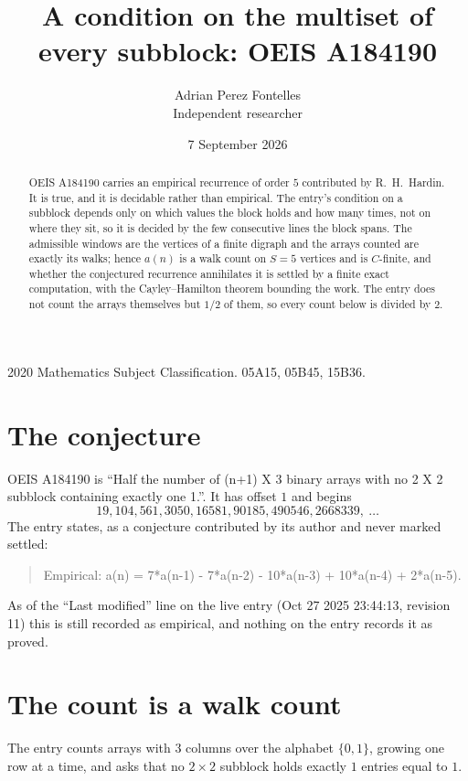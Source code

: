 \documentclass[11pt,a4paper]{article}
\title{A condition on the multiset of every subblock: OEIS A184190}
\author{Adrian Perez Fontelles\\ \small Independent researcher}
\date{7 September 2026}
\theoremstyle{plain}
\theoremstyle{definition}
\begin{document}
\maketitle

\begin{abstract}
OEIS A184190 carries an empirical recurrence of order $5$ contributed by R.~H.~Hardin. It is
true, and it is decidable rather than empirical. The entry's condition on a subblock depends
only on which values the block holds and how many times, not on where they sit, so it is
decided by the few consecutive lines the block spans. The admissible windows are the vertices
of a finite digraph and the arrays counted are exactly its walks; hence $a(n)$ is a walk count
on $S=5$ vertices and is $C$-finite, and whether the conjectured recurrence annihilates it
is settled by a finite exact computation, with the Cayley--Hamilton theorem bounding the
work. The entry does not count the arrays themselves but $1/2$ of them, so every count below is divided by $2$.
\end{abstract}

\noindent\small 2020 Mathematics Subject Classification. 05A15, 05B45, 15B36.\normalsize

\section{The conjecture}

OEIS A184190 is ``Half the number of (n+1) X 3 binary arrays with no 2 X 2 subblock containing exactly one 1.''. It has offset $1$ and begins
\[
19, 104, 561, 3050, 16581, 90185, 490546, 2668339,\ \dots
\]
The entry states, as a conjecture contributed by its author and never marked settled:
\begin{quote}
Empirical: a(n) = 7*a(n-1) - 7*a(n-2) - 10*a(n-3) + 10*a(n-4) + 2*a(n-5).
\end{quote}
As of the ``Last modified'' line on the live entry (Oct 27 2025 23:44:13, revision 11) this is still
recorded as empirical, and nothing on the entry records it as proved.

\section{The count is a walk count}

The entry counts arrays with $3$ columns over the alphabet $\{0,1\}$, growing one row at a time, and asks that no $2\times2$ subblock holds exactly $1$ entries equal to $1$.
\end{document}
